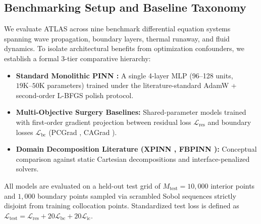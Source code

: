 \documentclass[runningheads]{llncs}
\begin{document}
\subsection{Benchmarking Setup and Baseline Taxonomy}
We evaluate ATLAS across nine benchmark differential equation systems spanning wave propagation, boundary layers, thermal runaway, and fluid dynamics. To isolate architectural benefits from optimization confounders, we establish a formal 3-tier comparative hierarchy:
\begin{itemize}
    \item \textbf{Standard Monolithic PINN \cite{raissi2019physics}:} A single 4-layer MLP (96--128 units, $19\text{K}\text{--}50\text{K}$ parameters) trained under the literature-standard AdamW + second-order L-BFGS polish protocol.
    \item \textbf{Multi-Objective Surgery Baselines:} Shared-parameter models trained with first-order gradient projection between residual loss $\mathcal{L}_{\text{res}}$ and boundary losses $\mathcal{L}_{\text{bc}}$ (PCGrad \cite{yu2020gradient}, CAGrad \cite{liu2021cagrad}).
    \item \textbf{Domain Decomposition Literature (XPINN \cite{jagtap2020extended}, FBPINN \cite{moseley2023finite}):} Conceptual comparison against static Cartesian decompositions and interface-penalized solvers.
\end{itemize}

All models are evaluated on a held-out test grid of $M_{\text{test}} = 10{,}000$ interior points and $1{,}000$ boundary points sampled via scrambled Sobol sequences strictly disjoint from training collocation points. Standardized test loss is defined as $\mathcal{L}_{\text{test}} = \mathcal{L}_{\text{res}} + 20\mathcal{L}_{\text{bc}} + 20\mathcal{L}_{\text{ic}}$.
\end{document}
